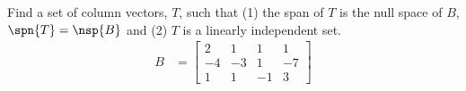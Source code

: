 Find a set of column vectors, $T$, such that (1) the span of $T$ is the null space of $B$, $\spn{T}=\nsp{B}$ and (2) $T$ is a linearly independent set.
%
\begin{align*}
B&=
\begin{bmatrix}
 2 & 1 & 1 & 1 \\
 -4 & -3 & 1 & -7 \\
 1 & 1 & -1 & 3
\end{bmatrix}
\end{align*}